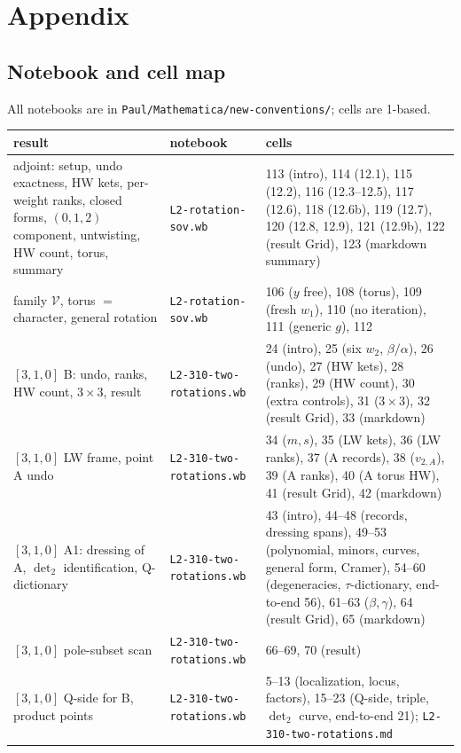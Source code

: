 \documentclass[11pt]{article}
\newcommand{\nb}[1]{\texttt{#1}}
\begin{document}
\appendix
\section{Appendix}

\subsection{Notebook and cell map}\label{app:map}
All notebooks are in \nb{Paul/Mathematica/new-conventions/}; cells are 1-based.
\begin{center}\small
\begin{longtable}{@{}p{4.7cm}p{5.1cm}p{6.3cm}@{}}\toprule
result & notebook & cells\\\midrule\endhead
adjoint: setup, undo exactness, HW kets, per-weight ranks, closed forms, $(0,1,2)$ component, untwisting, HW count, torus, summary & \nb{L2-rotation-sov.wb} & 113 (intro), 114 (12.1), 115 (12.2), 116 (12.3--12.5), 117 (12.6), 118 (12.6b), 119 (12.7), 120 (12.8, 12.9), 121 (12.9b), 122 (result Grid), 123 (markdown summary)\\
family $\mathcal V$, torus $=$ character, general rotation & \nb{L2-rotation-sov.wb} & 106 ($y$ free), 108 (torus), 109 (fresh $w_1$), 110 (no iteration), 111 (generic $g$), 112\\
$[3,1,0]$ B: undo, ranks, HW count, $3\times3$, result & \nb{L2-310-two-rotations.wb} & 24 (intro), 25 (six $w_2$, $\beta/\alpha$), 26 (undo), 27 (HW kets), 28 (ranks), 29 (HW count), 30 (extra controls), 31 ($3\times3$), 32 (result Grid), 33 (markdown)\\
$[3,1,0]$ LW frame, point A undo & \nb{L2-310-two-rotations.wb} & 34 ($m,s$), 35 (LW kets), 36 (LW ranks), 37 (A records), 38 ($v_{2,A}$), 39 (A ranks), 40 (A torus HW), 41 (result Grid), 42 (markdown)\\
$[3,1,0]$ A1: dressing of A, $\det_2$ identification, Q-dictionary & \nb{L2-310-two-rotations.wb} & 43 (intro), 44--48 (records, dressing spans), 49--53 (polynomial, minors, curves, general form, Cramer), 54--60 (degeneracies, $\tau$-dictionary, end-to-end 56), 61--63 ($\beta,\gamma$), 64 (result Grid), 65 (markdown)\\
$[3,1,0]$ pole-subset scan & \nb{L2-310-two-rotations.wb} & 66--69, 70 (result)\\
$[3,1,0]$ Q-side for B, product points & \nb{L2-310-two-rotations.wb} & 5--13 (localization, locus, factors), 15--23 (Q-side, triple, $\det_2$ curve, end-to-end 21); \nb{L2-310-two-rotations.md}\\

\end{longtable}
\end{center}
\end{document}
